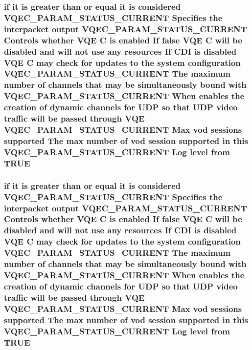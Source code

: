 \subsubsection{\setlength{\rightskip}{0pt plus 5cm}if it is greater than or equal it is considered VQEC\_\-PARAM\_\-STATUS\_\-CURRENT Specifies the interpacket output VQEC\_\-PARAM\_\-STATUS\_\-CURRENT Controls whether VQE \bf{C} is enabled If false VQE \bf{C} will be disabled and will not use any resources If CDI is disabled VQE \bf{C} may check for updates \bf{to} the system configuration VQEC\_\-PARAM\_\-STATUS\_\-CURRENT The maximum number of \bf{channels} that may be simultaneously bound with VQEC\_\-PARAM\_\-STATUS\_\-CURRENT When enables the creation of dynamic \bf{channels} for UDP so that UDP video traffic will be passed through VQE VQEC\_\-PARAM\_\-STATUS\_\-CURRENT Max vod sessions supported The max number of vod session supported in \bf{this} VQEC\_\-PARAM\_\-STATUS\_\-CURRENT Log level from \bf{TRUE}}\label{vqec__cfg__settings_8h_9b83e07cdf53ed83b96d72854add8fb5}


\subsubsection{\setlength{\rightskip}{0pt plus 5cm}if it is greater than or equal it is considered VQEC\_\-PARAM\_\-STATUS\_\-CURRENT Specifies the interpacket output VQEC\_\-PARAM\_\-STATUS\_\-CURRENT Controls whether VQE \bf{C} is enabled If false VQE \bf{C} will be disabled and will not use any resources If CDI is disabled VQE \bf{C} may check for updates \bf{to} the system configuration VQEC\_\-PARAM\_\-STATUS\_\-CURRENT The maximum number of \bf{channels} that may be simultaneously bound with VQEC\_\-PARAM\_\-STATUS\_\-CURRENT When enables the creation of dynamic \bf{channels} for UDP so that UDP video traffic will be passed through VQE VQEC\_\-PARAM\_\-STATUS\_\-CURRENT Max vod sessions supported The max number of vod session supported in \bf{this} VQEC\_\-PARAM\_\-STATUS\_\-CURRENT Log level from \bf{TRUE}}\label{vqec__cfg__settings_8h_9b83e07cdf53ed83b96d72854add8fb5}


